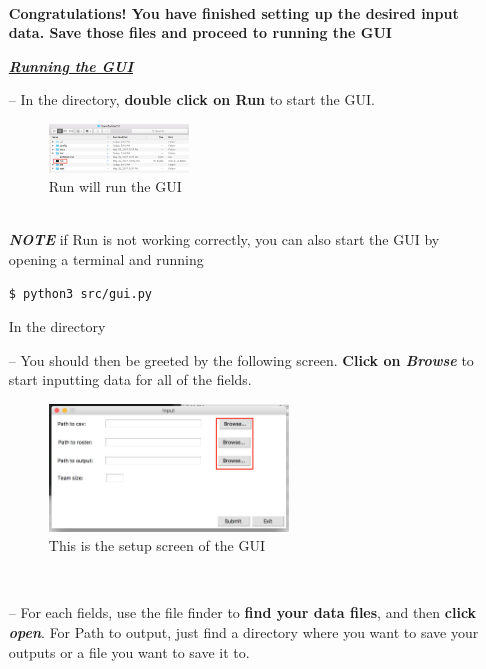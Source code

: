\documentclass[10pt]{article}
\begin{document}
\begin{enumerate}
\begin{figure}[h]
\end{figure}\\
\textbf{Congratulations! You have finished setting up the desired input data. Save those files and proceed to running the GUI}
\newpage
\maketitle
\LARGE
\textbf{\textit{\underline{Running the GUI}}}
\normalsize
\item[--] In the directory, \textbf{double click on Run} to start the GUI. 
\begin{figure}[h]
\caption{Run will run the GUI}
\centering
\includegraphics[width=0.35\textwidth]{pic9}
\end{figure}\\
\textbf{\textit{NOTE}} if Run is not working correctly, you can also start the GUI by opening a terminal and running\\
\begin{lstlisting}
$ python3 src/gui.py
\end{lstlisting}
In the directory\\
\item[--] You should then be greeted by the following screen. \textbf{Click on \textit{Browse}} to start inputting data for all of the fields. 
\begin{figure}[h]
\caption{This is the setup screen of the GUI}
\centering
\includegraphics[width=0.6\textwidth]{pic10}
\end{figure}\\
\item[--] For each fields, use the file finder to \textbf{find your data files}, and then \textbf{click \textit{open}}. For Path to output, just find a directory where you want to save your outputs or a file you want to save it to.
\begin{figure}[h]

\end{figure}
\end{enumerate}
\end{document}
